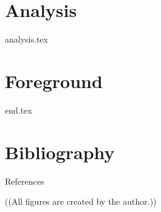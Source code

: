 \documentclass[UKenglish,aspectratio=169]{beamer}
\begin{document}


\section{Analysis}\label{sec:analysis}
{{analysis.tex}}

\section{Foreground}\label{sec:end}
{{end.tex}}










\section*{Bibliography}
\begin{frame}{References}
  
  \medskip
  \textcolor{uiogrey}{((All figures are created by the author.))}
\end{frame}
\end{document}
